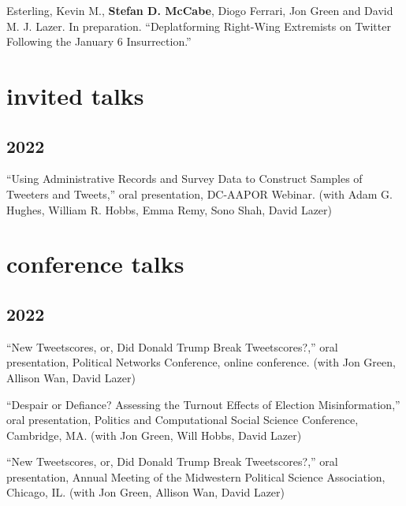 \documentclass[11pt, letter]{article}
\begin{document}
\begin{hangparas}{.25in}{1}
Esterling, Kevin M.,\textsuperscript{\textdagger} \textbf{Stefan D. McCabe},\textsuperscript{\textdagger} Diogo Ferrari, Jon Green and David M. J. Lazer. In preparation. ``Deplatforming Right-Wing Extremists on Twitter Following the January 6 Insurrection.''\vspace{2mm}




\end{hangparas}

\section{invited talks}
\subsection{2022}
\begin{hangparas}{.25in}{1}
``Using Administrative Records and Survey Data to Construct Samples of Tweeters and Tweets,'' oral presentation, DC-AAPOR Webinar. (with Adam G. Hughes, William R. Hobbs, Emma Remy, Sono Shah, David Lazer) \vspace{2mm}
\end{hangparas}

\vspace{2mm}
\section{conference talks}

\subsection{2022}
\begin{hangparas}{.25in}{1}
``New Tweetscores, or, Did Donald Trump Break Tweetscores?,'' oral presentation, Political Networks Conference, online conference. (with Jon Green, Allison Wan, David Lazer)
\vspace{2mm}

``Despair or Defiance? Assessing the Turnout Effects of Election Misinformation,'' oral presentation, Politics and Computational Social Science Conference, Cambridge, MA. (with Jon Green, Will Hobbs, David Lazer)
\vspace{2mm}

``New Tweetscores, or, Did Donald Trump Break Tweetscores?,'' oral presentation, Annual Meeting of the Midwestern Political Science Association, Chicago, IL. (with Jon Green, Allison Wan, David Lazer)
\vspace{2mm}
\end{hangparas}
\end{document}
